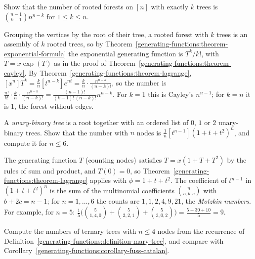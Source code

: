 \begin{exercise}\label{generating-functions:exercise-forests}
Show that the number of rooted forests on $[n]$ with exactly $k$ trees is $\binom{n - 1}{k - 1}n^{n-k}$ for $1 \leq k \leq n$.
\end{exercise}

\begin{solution}
Grouping the vertices by the root of their tree, a rooted forest with $k$ trees is an assembly of $k$ rooted trees, so by Theorem~\ref{generating-functions:theorem-exponential-formula} the exponential
generating function is $T^k/k!$, with $T = x\exp(T)$ as in the proof of Theorem~\ref{generating-functions:theorem-cayley}. By Theorem~\ref{generating-functions:theorem-lagrange},
$[x^n]T^k = \frac{k}{n}[t^{n-k}]e^{nt} = \frac{k}{n}\cdot\frac{n^{n-k}}{(n - k)!}$, so the number is $\frac{n!}{k!}\cdot\frac{k}{n}\cdot\frac{n^{n-k}}{(n - k)!} = \frac{(n - 1)!}{(k - 1)!\,(n - k)!}n^{n-k}$.
For $k = 1$ this is Cayley's $n^{n-1}$; for $k = n$ it is $1$, the forest without edges.
\end{solution}

\begin{exercise}\label{generating-functions:exercise-motzkin}
A \emph{unary-binary tree} is a root together with an ordered list of $0$, $1$ or $2$ unary-binary trees. Show that the number with $n$ nodes is $\frac{1}{n}[t^{n-1}](1 + t + t^2)^n$, and compute it for
$n \leq 6$.
\end{exercise}

\begin{solution}
The generating function $T$ (counting nodes) satisfies $T = x(1 + T + T^2)$ by the rules of sum and product, and $T(0) = 0$, so Theorem~\ref{generating-functions:theorem-lagrange} applies with
$\phi = 1 + t + t^2$. The coefficient of $t^{n-1}$ in $(1 + t + t^2)^n$ is the sum of the multinomial coefficients $\binom{n}{a, b, c}$ with $b + 2c = n - 1$; for $n = 1, \ldots, 6$ the counts are
$1, 1, 2, 4, 9, 21$, the \emph{Motzkin numbers}. For example, for $n = 5$: $\frac15\bigl(\binom{5}{1, 4, 0} + \binom{5}{2, 2, 1} + \binom{5}{3, 0, 2}\bigr) = \frac{5 + 30 + 10}{5} = 9$.
\end{solution}

\begin{exercise}\label{generating-functions:exercise-ternary}
Compute the numbers of ternary trees with $n \leq 4$ nodes from the recurrence of Definition~\ref{generating-functions:definition-mary-tree}, and compare with
Corollary~\ref{generating-functions:corollary-fuss-catalan}.
\end{exercise}

